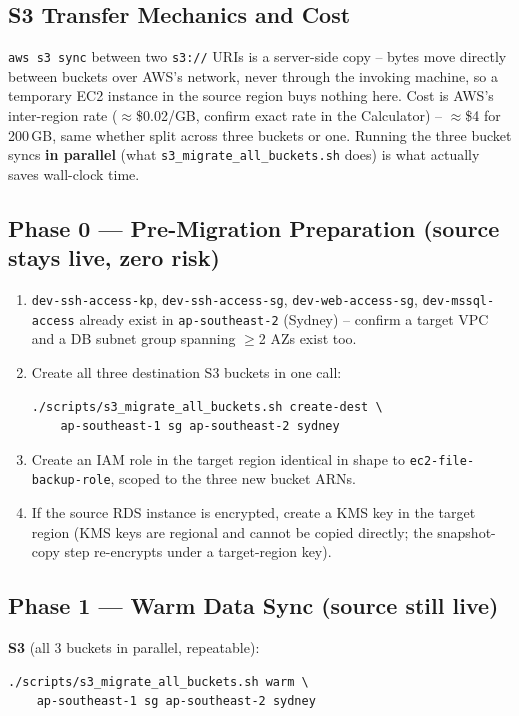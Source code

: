 \documentclass[10pt]{article}
\begin{document}
\subsection{S3 Transfer Mechanics and Cost}
\label{sec:transfer-mechanics}

\texttt{aws s3 sync} between two \texttt{s3://} URIs is a server-side copy
-- bytes move directly between buckets over AWS's network, never through
the invoking machine, so a temporary EC2 instance in the source region
buys nothing here. Cost is AWS's inter-region rate ($\approx$\$0.02/GB,
confirm exact rate in the Calculator) -- $\approx$\$4 for 200\,GB, same
whether split across three buckets or one. Running the three bucket syncs
\textbf{in parallel} (what \texttt{s3\_migrate\_all\_buckets.sh} does) is
what actually saves wall-clock time.

\subsection{Phase 0 --- Pre-Migration Preparation (source stays live, zero risk)}
\begin{enumerate}
  \item \texttt{dev-ssh-access-kp}, \texttt{dev-ssh-access-sg}, \texttt{dev-web-access-sg}, \texttt{dev-mssql-access} already exist in \texttt{ap-southeast-2} (Sydney) -- confirm a target VPC and a DB subnet group spanning $\ge$2 AZs exist too.
  \item Create all three destination S3 buckets in one call:
\begin{lstlisting}[style=bashStyle]
./scripts/s3_migrate_all_buckets.sh create-dest \
    ap-southeast-1 sg ap-southeast-2 sydney
\end{lstlisting}
  \item Create an IAM role in the target region identical in shape to \texttt{ec2-file-backup-role}, scoped to the three new bucket ARNs.
  \item If the source RDS instance is encrypted, create a KMS key in the target region (KMS keys are regional and cannot be copied directly; the snapshot-copy step re-encrypts under a target-region key).
\end{enumerate}

\subsection{Phase 1 --- Warm Data Sync (source still live)}

\textbf{S3} (all 3 buckets in parallel, repeatable):
\begin{lstlisting}[style=bashStyle]
./scripts/s3_migrate_all_buckets.sh warm \
    ap-southeast-1 sg ap-southeast-2 sydney
\end{lstlisting}
\end{document}
